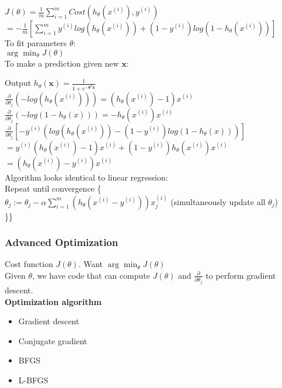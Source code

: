 \documentclass{article}
\newcommand\tab[1][1cm]{\hspace*{#1}}
\newcommand{\vect}[1]{\boldsymbol{#1}}
\begin{document}
$J(\theta)= \frac{1}{m}\sum_{i=1}^{m} Cost(h_\theta(x^{(i)}), y^{(i)})$ \\

$ = -\frac{1}{m}[ \sum_{i=1}^{m} y^{(i)}log(h_\theta(x^{(i)})) + (1-y^{(i)})log(1 - h_\theta(x^{(i)}))]$\\

To fit parameters $\theta$: \\
\tab $\arg\min_{\theta} J(\theta)$ \\

To make a prediction given new $\vect{x}$:

\tab Output $h_\theta(\vect{x}) = \frac{1}{1 + e^{-\vect{\theta}^T \vect{x}}}$ \\

$\frac{\partial}{\partial \theta_j}(-log(h_\theta(x^{(i)}))) = (h_\theta(x^{(i)})-1)x^{(i)}$ \\
$\frac{\partial}{\partial \theta_j}(-log(1 - h_\theta(x))) = -h_\theta(x^{(i)})x^{(i)}$ \\

$\frac{\partial}{\partial \theta_j}[-y^{(i)}(log(h_\theta(x^{(i)})) - (1-y^{(i)})log(1 - h_\theta(x)))]$\\
$ = y^{(i)}(h_\theta(x^{(i)})-1)x^{(i)} + (1-y^{(i)})h_\theta(x^{(i)})x^{(i)} $\\
$ = (h_\theta(x^{(i)}) - y^{(i)}) x^{(i)}$\\

Algorithm looks identical to linear regression:\\
Repeat until convergence \{\\
\tab $\theta_j := \theta_j - \alpha \sum_{i=1}^{m}(h_\theta(x^{(i)} - y^{(i)})) x_{j}^{(i)}$ (simultaneously update all $\theta_j$) \\
\}\}\\

\subsubsection{Advanced Optimization}
Cost function $J(\theta)$. Want $\arg\min_\theta J(\theta)$\\
Given $\theta$, we have code that can compute $J(\theta)$ and $\frac{\partial}{\partial \theta_j}$ to perform gradient descent.\\

\textbf{Optimization algorithm}
\begin{itemize}
  \item Gradient descent
  \item Conjugate gradient
  \item BFGS
  \item L-BFGS
\end{itemize}
\end{document}
